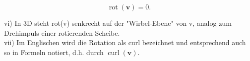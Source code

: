 \documentclass[10pt]{article}
\begin{document}
\begin{equation*}
\operatorname{rot}(\mathbf{v})=0 . \tag{2.158}
\end{equation*}


vi) In 3D steht rot(v) senkrecht auf der "Wirbel-Ebene" von v, analog zum Drehimpuls einer rotierenden Scheibe.\\
vii) Im Englischen wird die Rotation als curl bezeichnet und entsprechend auch so in Formeln notiert, d.h. durch $\operatorname{curl}(\mathbf{v})$.
\end{document}
